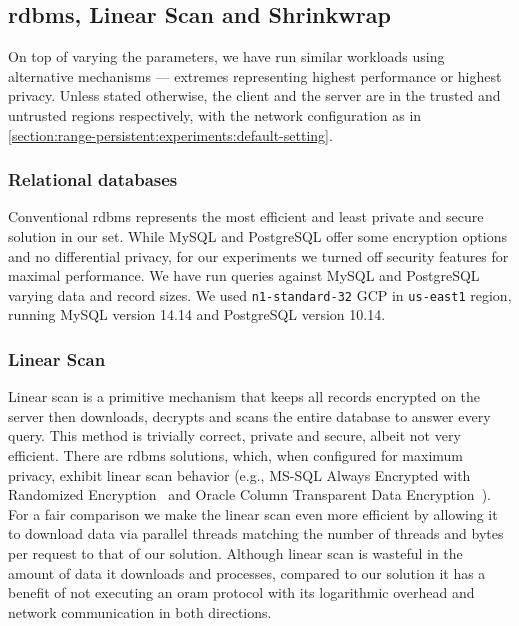 	\subsection{\acrshort{rdbms}, Linear Scan and Shrinkwrap}

		On top of varying the parameters, we have run similar workloads using alternative mechanisms --- extremes representing highest performance or highest privacy.
		Unless stated otherwise, the client and the server are in the trusted and untrusted regions respectively, with the network configuration as in \cref{section:range-persistent:experiments:default-setting}.

		\subsubsection*{Relational databases}

			Conventional \acrshort{rdbms} represents the most efficient and least private and secure solution in our set.
			While MySQL and PostgreSQL offer some encryption options and no differential privacy, for our experiments we turned off security features for maximal performance.
			We have run queries against MySQL and PostgreSQL varying data and record sizes.
			We used \texttt{n1-standard-32} GCP  in \texttt{us-east1} region, running MySQL version 14.14 and PostgreSQL version 10.14.

		\subsubsection*{Linear Scan}

			Linear scan is a primitive mechanism that keeps all records encrypted on the server then downloads, decrypts and scans the entire database to answer every query.
			This method is trivially correct, private and secure, albeit not very efficient.
			There are \acrshort{rdbms} solutions, which, when configured for maximum privacy, exhibit linear scan behavior (e.g., MS-SQL Always Encrypted with Randomized Encryption~\cite{mssql-always-enc} and Oracle Column Transparent Data Encryption~\cite{oracle-tde}).
			For a fair comparison we make the linear scan even more efficient by allowing it to download data via parallel threads matching the number of threads and bytes per request to that of our solution.
			Although linear scan is wasteful in the amount of data it downloads and processes, compared to our solution it has a benefit of not executing an \acrshort{oram} protocol with its logarithmic overhead and network communication in both directions.

